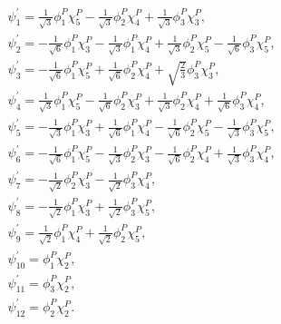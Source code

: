 \documentclass[prd,twocolumn,floatfix,nofootinbib]{revtex4}
\begin{document}
\begin{align}
    &\psi_{1}^{\prime} = \frac{1}{\sqrt{3}}\phi_{1}^{P}\chi_{5}^{P}-\frac{1}{\sqrt{3}}\phi_{2}^{P}\chi_{4}^{P}+\frac{1}{\sqrt{3}}\phi_{3}^{P}\chi_{3}^{P}, \\
    &\psi_{2}^{\prime} = -\frac{1}{\sqrt{6}}\phi_{1}^{P}\chi_{3}^{P}-\frac{1}{\sqrt{3}}\phi_{1}^{P}\chi_{4}^{P}+\frac{1}{\sqrt{3}}\phi_{2}^{P}\chi_{5}^{P}
        -\frac{1}{\sqrt{6}}\phi_{3}^{P}\chi_{5}^{P}, \\
    &\psi_{3}^{\prime} = -\frac{1}{\sqrt{6}}\phi_{1}^{P}\chi_{5}^{P}+\frac{1}{\sqrt{6}}\phi_{2}^{P}\chi_{4}^{P}+\sqrt{\frac{2}{3}}\phi_{3}^{P}\chi_{3}^{P}, \\
    &\psi_{4}^{\prime} = \frac{1}{\sqrt{3}}\phi_{1}^{P}\chi_{5}^{P}-\frac{1}{\sqrt{6}}\phi_{2}^{P}\chi_{3}^{P}+\frac{1}{\sqrt{3}}\phi_{2}^{P}\chi_{4}^{P}
        +\frac{1}{\sqrt{6}}\phi_{3}^{P}\chi_{4}^{P}, \\
    &\psi_{5}^{\prime} = -\frac{1}{\sqrt{3}}\phi_{1}^{P}\chi_{3}^{P}+\frac{1}{\sqrt{6}}\phi_{1}^{P}\chi_{4}^{P}-\frac{1}{\sqrt{6}}\phi_{2}^{P}\chi_{5}^{P}
        -\frac{1}{\sqrt{3}}\phi_{3}^{P}\chi_{5}^{P}, \\
    &\psi_{6}^{\prime} = -\frac{1}{\sqrt{6}}\phi_{1}^{P}\chi_{5}^{P}-\frac{1}{\sqrt{3}}\phi_{2}^{P}\chi_{3}^{P}-\frac{1}{\sqrt{6}}\phi_{2}^{P}\chi_{4}^{P}
        +\frac{1}{\sqrt{3}}\phi_{3}^{P}\chi_{4}^{P}, \\
    &\psi_{7}^{\prime} = -\frac{1}{\sqrt{2}}\phi_{2}^{P}\chi_{3}^{P}-\frac{1}{\sqrt{2}}\phi_{3}^{P}\chi_{4}^{P}, \\
    &\psi_{8}^{\prime} = -\frac{1}{\sqrt{2}}\phi_{1}^{P}\chi_{3}^{P}+\frac{1}{\sqrt{2}}\phi_{3}^{P}\chi_{5}^{P}, \\
    &\psi_{9}^{\prime} = \frac{1}{\sqrt{2}}\phi_{1}^{P}\chi_{4}^{P}+\frac{1}{\sqrt{2}}\phi_{2}^{P}\chi_{5}^{P}, \\
    &\psi_{10}^{\prime} = \phi_{1}^{P}\chi_{2}^{P}, \\
    &\psi_{11}^{\prime} = \phi_{3}^{P}\chi_{2}^{P}, \\
    &\psi_{12}^{\prime} = \phi_{2}^{P}\chi_{2}^{P}.
\end{align}
\end{document}
